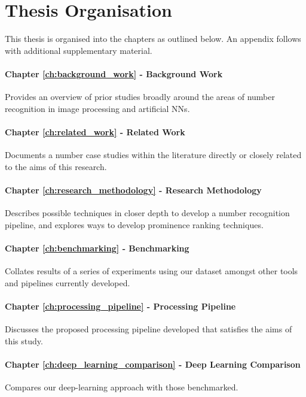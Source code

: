 \section{Thesis Organisation}

This thesis is organised into the chapters as outlined below. An appendix follows with additional supplementary material.

\paragraph{Chapter \ref{ch:background_work} - Background Work} Provides an overview of prior studies broadly around the areas of number recognition in image processing and artificial NNs.

\paragraph{Chapter \ref{ch:related_work} - Related Work} Documents a number case studies within the literature directly or closely related to the aims of this research.

\paragraph{Chapter \ref{ch:research_methodology} - Research Methodology} Describes possible techniques in closer depth to develop a number recognition pipeline, and explores ways to develop prominence ranking techniques.

\paragraph{Chapter \ref{ch:benchmarking} - Benchmarking} Collates results of a series of experiments using our dataset amongst other tools and pipelines currently developed.

\paragraph{Chapter \ref{ch:processing_pipeline} - Processing Pipeline} Discusses the proposed processing pipeline developed that satisfies the aims of this study.

\paragraph{Chapter \ref{ch:deep_learning_comparison} - Deep Learning Comparison} Compares our deep-learning approach with those benchmarked.

